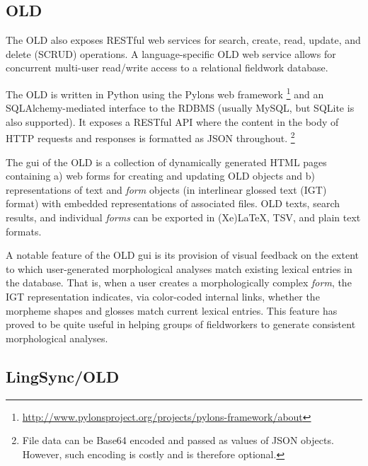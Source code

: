 \documentclass[11pt]{article}
\begin{document}
\subsection{OLD}\label{sec:old}

The OLD also exposes RESTful web services for search, create, read, update, and delete
(SCRUD) operations. A language-specific OLD web service allows for concurrent
multi-user read/write access to a relational fieldwork database. 




The OLD is written in Python using the Pylons web framework%
\footnote{\url{http://www.pylonsproject.org/projects/pylons-framework/about}} %
and an SQLAlchemy-mediated interface to the RDBMS (usually MySQL, but SQLite is also
supported). It exposes a RESTful API where the content in the body of HTTP 
requests and responses is formatted as JSON throughout.%
\footnote{File data can be Base64 encoded and passed as values of JSON objects.
However, such encoding is costly and is therefore optional.} %



The \gls{gui} of the OLD %
is a collection of dynamically generated HTML pages containing a) web forms for
creating and updating OLD objects and b) representations of text and
\emph{form} objects (in interlinear glossed text (IGT) format) with embedded
representations of associated files. OLD texts, search results, and individual
\emph{forms} can be exported in (Xe)LaTeX, TSV, and plain text formats.

A notable feature of the OLD \gls{gui} is its provision of visual feedback on the
extent to which user-generated morphological analyses match existing lexical
entries in the database. That is, when a user creates a morphologically complex
\emph{form}, the IGT representation indicates, via color-coded internal links,
whether the morpheme shapes and glosses match current lexical entries. This
feature has proved to be quite useful in helping groups of fieldworkers to
generate consistent morphological analyses.



\subsection{LingSync/OLD}
\end{document}
